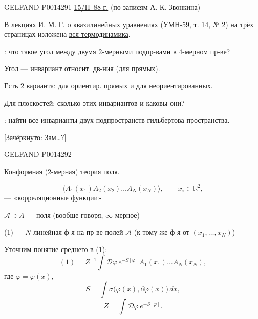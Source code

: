 \begin{GelfandAdjacentEvidence}{GELFAND-P001429}{1}
\uline{15/II--88 г.}\qquad {}
(по записям А. К. Звонкина)

В лекциях И. М. Г. о квазилинейных уравнениях
(\href{https://www.mathnet.ru/eng/rm7290}{УМН-59, т. 14, № 2})
на трёх страницах изложена \uline{вся термодинамика}.

: что такое угол между двумя \(2\)-мерными подпр-вами в \(4\)-мерном пр-ве?

Угол — инвариант относит. дв-ния (для прямых).

Есть \(2\) варианта: для ориентир. прямых и для неориентированных.

Для плоскостей: сколько этих инвариантов и каковы они?

: найти все инварианты двух подпространств гильбертова пространства.

[Зачёркнуто: Зам\ldots{}?]
\end{GelfandAdjacentEvidence}
\begin{GelfandAdjacentEvidence}{GELFAND-P001429}{2}


\qquad
\uline{Конформная (2-мерная) теория поля.}

\begin{equation*}
\tag{1}
\langle A_1(x_1)A_2(x_2)\ldots A_N(x_N)\rangle,\qquad x_i\in\mathbb R^2,
\end{equation*}
— «корреляционные функции»

\(\mathcal A\ni A\) — поля (вообще говоря, \(\infty\)-мерное)

(1) — \(N\)-линейная ф-я на пр-ве полей \(\mathcal A\)
(к тому же ф-я от \((x_1,\ldots,x_N)\))

Уточним понятие среднего в (1):
\begin{equation*}
\tag{2}
(1)=Z^{-1}\int\mathcal D\varphi\, e^{-S[\varphi]}A_1(x_1)\ldots A_N(x_N),
\end{equation*}
где \(\varphi=\varphi(x)\),
\begin{equation*}
\tag{3}
S=\int\sigma\bigl(\varphi(x),\partial\varphi(x)\bigr)\,dx,
\end{equation*}
\begin{equation*}
\tag{4}
Z=\int\mathcal D\varphi\,e^{-S[\varphi]}.
\end{equation*}
\end{GelfandAdjacentEvidence}
